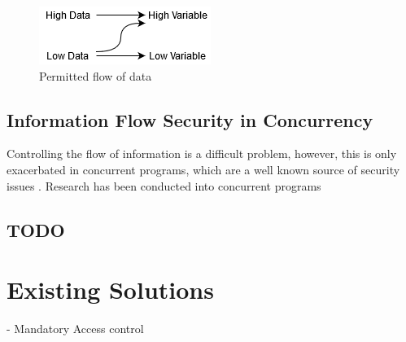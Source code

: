 \documentclass[twocolumn]{article}
\begin{document}
    \begin{figure}
        \label{fig:flow}
        \includegraphics{flow.png}
        \caption{Permitted flow of data}
    \end{figure}

    \subsection{Information Flow Security in Concurrency}
    Controlling the flow of information is a difficult problem, however, this is only exacerbated in concurrent programs, which are a well known source of security issues \cite{mantel2014noninterference}\cite{smith2019value}\cite{vaughan2012secure}. Research has been conducted into concurrent programs 

    \cite{winter2020concurrency}

    \subsection{TODO}





    \section{Existing Solutions}

    - Mandatory Access control %

    \printbibliography
\end{document}
